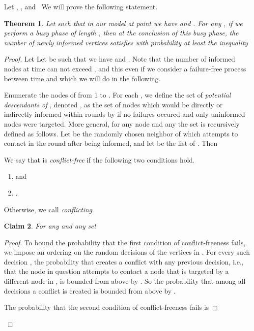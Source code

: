 \documentclass[12pt]{article}
\newtheorem{theorem}{Theorem}
\newtheorem{claim}[theorem]{Claim}
\begin{document}
{Let , ,  and~ We will prove the following statement.

\begin{theorem}\label{1busyphase}
Let  such that in our model at point  we have  and .
For any ,
if we perform a busy phase of length , then at the conclusion of this busy phase, the number of newly informed vertices satisfies with probability at least  the inequality

\end{theorem}

\begin{proof}
Let 
Let  be such that we have  and . Note that the number of informed nodes at time  can not exceed , and this even if we consider a failure-free process between time  and  which we will do in the following.

Enumerate the nodes of  from 1 to . 
For each , we define the set of \emph{potential descendants of} , denoted , as the set of nodes which would be directly or indirectly informed within rounds  by  if no failures occured and only uninformed nodes were targeted. More general, for any node  and any  the set  is recursively defined as follows.
Let  be the randomly chosen neighbor of  which  attempts to contact in the round after being informed, and let  be the list of . Then

We say that  is \emph{conflict-free} if the following two conditions hold.
	\begin{enumerate}
	\item  and
	\item . 
	\end{enumerate}	
Otherwise, we call  \emph{conflicting}.

\begin{claim}\label{cl:1}
For any  and any set 

\end{claim}

\begin{proof}
To bound the probability that the first condition of conflict-freeness fails, we impose an ordering on the random decisions of the vertices in .
For every such decision , the probability that  creates a conflict with any previous decision, i.e., that the node in question attempts to contact a node that is targeted by a different node in , is bounded from above by . 
So the probability that among all decisions a conflict is created is bounded from above by .

The probability that the second condition of conflict-freeness fails is


\end{proof}
\end{proof}}
\end{document}
